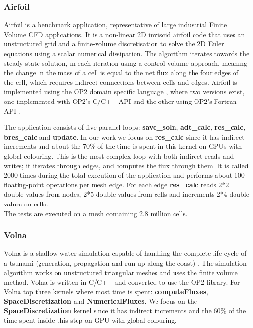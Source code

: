 \subsubsection{Airfoil}
Airfoil is a benchmark application, representative of
large industrial Finite Volume CFD applications. It is a non-linear 2D inviscid
airfoil code that uses an unstructured grid and a finite-volume discretisation
to solve the 2D Euler equations using a scalar numerical dissipation. The
algorithm iterates towards the steady state solution, in each iteration using a
control volume approach, meaning the change in the mass of a cell is equal to
the net flux along the four edges of the cell, which requires indirect
connections between cells and edges. Airfoil is implemented using the OP2 domain
specific language \cite{op2}, where two versions exist, one implemented with
OP2's C/C++ API and the other using OP2's Fortran API
\cite{giles2012op2,op2-repo}.

The application consists of five parallel loops: \textbf{save\_soln},
\textbf{adt\_calc}, \textbf{res\_calc}, \textbf{bres\_calc} and \textbf{update}.
In our work we focus on \textbf{res\_calc} since it has indirect increments and
about the 70\% of the time is spent in this kernel on GPUs with global
colouring.  This is the most complex loop with both indirect reads and writes; it
iterates through edges, and computes the flux through them. It is called 2000
times during the total execution of the application and performs about 100
floating-point operations per mesh edge. For each edge \textbf{res\_calc} reads 
2*2 double values from nodes, 2*5 double values from cells and increments
2*4 double values on cells.
\\
 The tests are executed on a mesh containing 2.8 million cells.

\subsubsection{Volna}
Volna is a shallow water simulation capable of handling the complete life-cycle
of a tsunami (generation, propagation and run-up along the coast)
\cite{dutykh2011volna}. The simulation algorithm works on unstructured
triangular meshes and uses the finite volume method. Volna is written in C/C++
and converted to use the OP2 library\cite{op2}. For Volna top three kernels
where most time is spent: \textbf{computeFluxes}, \textbf{SpaceDiscretization}
and \textbf{NumericalFluxes}. We focus on the \textbf{SpaceDiscretization}
kernel since it has indirect increments and the 60\% of the time spent inside
this step on GPU with global colouring. 


